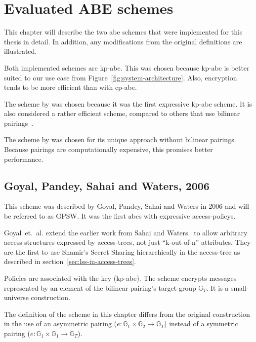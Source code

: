 \chapter{Evaluated ABE schemes}\label{chapter:constructions} 

This chapter will describe the two \acrlong{abe} schemes that were implemented for this thesis in detail.
In addition, any modifications from the original definitions are illustrated.

Both implemented schemes are \acrshort{kp-abe}.
This was chosen because \acrshort{kp-abe} is better suited to our use case from Figure~\ref{fig:system-architecture}.
Also, encryption tends to be more efficient than with \acrshort{cp-abe}.

The scheme by \citeauthor{goyal_attribute-based_2006} was chosen because it was the first expressive \acrshort{kp-abe} scheme.
It is also considered a rather efficient scheme, compared to others that use bilinear pairings~\cite{girgenti_feasibility_2019}.

The scheme by \citeauthor{yao_lightweight_2015} was chosen for its unique approach without bilinear pairings. Because pairings are computationally expensive, this promises better performance.

\section{Goyal, Pandey, Sahai and Waters, 2006}
This scheme was described by Goyal, Pandey, Sahai and Waters \cite{goyal_attribute-based_2006} in 2006 and will be referred to as GPSW.
It was the first \acrshort{abes} with expressive \glspl{access-policy}.

Goyal~et.~al. extend the earlier work from Sahai and Waters~\cite{sahai_fuzzy_2005} to allow arbitrary access structures expressed by \glspl{access-tree}, not just ``k-out-of-n'' attributes.
They are the first to use Shamir's Secret Sharing hierarchically in the \gls{access-tree} as described in section~\ref{sec:lss-in-access-trees}. 

Policies are associated with the key (\acrshort{kp-abe}).
The scheme encrypts messages represented by an element of the bilinear pairing's target group $\mathbb{G}_T$.
It is a \gls{small-universe} construction.

The definition of the scheme in this chapter differs from the original construction in the use of an asymmetric pairing ($e: \mathbb{G}_1 \times \mathbb{G}_2 \rightarrow \mathbb{G}_T$) instead of a symmetric pairing ($e: \mathbb{G}_1 \times \mathbb{G}_1 \rightarrow \mathbb{G}_T$).

